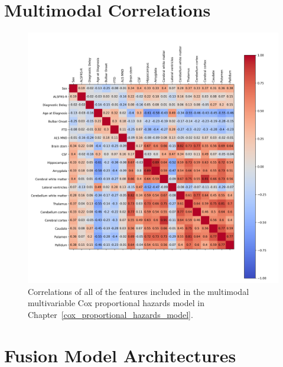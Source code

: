 
 \appendix
\chapter{Multimodal Correlations}
\begin{figure}
    \centering
    \includegraphics[width=\textwidth]{figures/multimodal_correlation}
    \caption{Correlations of all of the features included in the multimodal multivariable Cox proportional hazards model in Chapter~\ref{cox_proportional_hazards_model}.}
    \label{fig:multimodalcorrelations}
\end{figure}

\chapter{Fusion Model Architectures}
\label{appendix:fusion_model_architectures}

